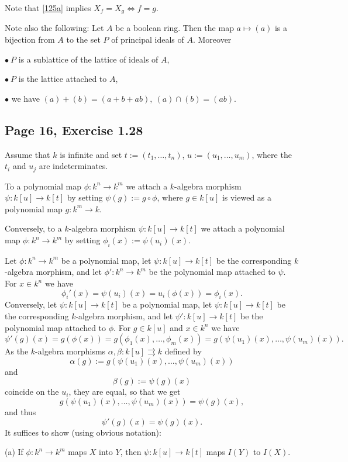 \documentclass[parskip=half,fontsize=12pt]{scrartcl}%
\begin{document}
Note that \eqref{125a} implies $X_f=X_g\iff f=g$.

Note also the following: Let $A$ be a boolean ring. Then the map $a\mapsto(a)$ is a bijection from $A$ to the set $P$ of principal ideals of $A$. Moreover 

$\bullet\ P$ is a sublattice of the lattice of ideals of $A$, 

$\bullet\  P$ is the lattice attached to $A$,

$\bullet$ we have $(a)+(b)=(a+b+ab),\ (a)\cap(b)=(ab)$. 

\subsection{Page 16, Exercise 1.28}%

Assume that $k$ is infinite and set $t:=(t_1,\dots,t_n)$, $u:=(u_1,\dots,u_m)$, where the $t_i$ and $u_j$ are indeterminates. 

To a polynomial map $\phi:k^n\to k^m$ we attach a $k$-algebra morphism $\psi:k[u]\to k[t]$ by setting $\psi(g):=g\circ\phi$, where $g\in k[u]$ is viewed as a polynomial map $g:k^m\to k$. 

Conversely, to a $k$-algebra morphism $\psi:k[u]\to k[t]$ we attach a polynomial map $\phi:k^n\to k^m$ by setting $\phi_i(x):=\psi(u_i)(x)$. 

Let $\phi:k^n\to k^m$ be a polynomial map, let $\psi:k[u]\to k[t]$ be the corresponding $k$-algebra morphism, and let $\phi':k^n\to k^m$ be the polynomial map attached to $\psi$. For $x\in k^n$ we have 
$$
\phi_i'(x)=\psi(u_i)(x)=u_i(\phi(x))=\phi_i(x).
$$ 
Conversely, let $\psi:k[u]\to k[t]$ be a polynomial map, let $\psi:k[u]\to k[t]$ be the corresponding $k$-algebra morphism, and let $\psi':k[u]\to k[t]$ be the polynomial map attached to $\phi$. For $g\in k[u]$ and $x\in k^n$ we have 
$$
\psi'(g)(x)=g(\phi(x))=g(\phi_1(x),\dots,\phi_m(x))=g(\psi(u_1)(x),\dots,\psi(u_m)(x)). 
$$ 
As the $k$-algebra morphisms $\alpha,\beta:k[u]\rightrightarrows k$ defined by 
$$
\alpha(g):=g(\psi(u_1)(x),\dots,\psi(u_m)(x))
$$ 
and 
$$
\beta(g):=\psi(g)(x)
$$ 
coincide on the $u_i$, they are equal, so that we get 
\begin{equation}\label{128}
g(\psi(u_1)(x),\dots,\psi(u_m)(x))=\psi(g)(x),
\end{equation}
and thus 
$$
\psi'(g)(x)=\psi(g)(x).
$$ 
It suffices to show (using obvious notation):

(a) If $\phi:k^n\to k^m$ maps $X$ into $Y$, then $\psi:k[u]\to k[t]$ maps $I(Y)$ to $I(X)$. 
\end{document}
